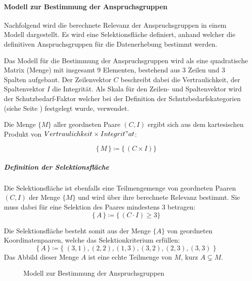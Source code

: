 \documentclass[../../main.tex]{subfiles}
\begin{document}
\paragraph*{Modell zur Bestimmung der Anspruchsgruppen}\mbox{}

\begin{sloppypar}
Nachfolgend wird die berechnete Relevanz der Anspruchsgruppen in einem Modell dargestellt. Es wird eine Selektionsfläche definiert, anhand welcher die definitiven Anspruchsgruppen für die Datenerhebung bestimmt werden.

Das Modell für die Bestimmung der Anspruchsgruppen wird als eine quadratische Matrix (Menge) mit insgesamt 9 Elementen, bestehend aus 3 Zeilen und 3 Spalten aufgebaut. Der Zeilenvektor $C$ beschreibt dabei die Vertraulichkeit, der Spaltenvektor $I$ die Integrität. Als Skala für den Zeilen- und Spaltenvektor wird der Schutzbedarf-Faktor welcher bei der Definition der Schutzbedarfskategorien (siehe Seite \pageref{Schutzbedarfskategorien}) festgelegt wurde, verwendet.

Die Menge $\{M\}$ aller geordneten Paare $(C,I)$ ergibt sich aus dem kartesischen Produkt von $Vertraulichkeit \times Integrit"at$:

\[\big\{\,M\,\big\} \coloneqq \bigg\{\,(C \times I) \bigg\}\]

\end{sloppypar}

\newpage
\subparagraph*{Definition der Selektionsfläche}\mbox{}

\begin{sloppypar}
Die Selektionsfläche ist ebenfalls eine Teilmengemenge von geordneten Paaren $(C,I)$ der Menge $\{M\}$ und wird über ihre berechnete Relevanz bestimmt. Sie muss dabei für eine Selektion des Paares mindestens 3 betragen:
\[\big\{\,A\,\big\} \coloneqq \bigg\{\,(C \cdot I) \geq 3 \bigg\}\]

Die Selektionsfläche besteht somit aus der Menge $\{A\}$ von geordneten Koordinatenpaaren, welche das Selektionkriterium erfüllen:
\[\big\{\,A\,\big\} \coloneqq \big\{\;(3,1),(2,2),(1,3),(3,2),(2,3),(3,3)\;\big\}\]
Das Abbild dieser Menge $A$ ist eine echte Teilmenge von $M$, kurz $A \subsetneq M$.

\end{sloppypar}

\begin{figure}[H]
    \centering
    
    \caption{Modell zur Bestimmung der Anspruchsgruppen}
    \label{fig:raster1}
\end{figure}
\end{document}
